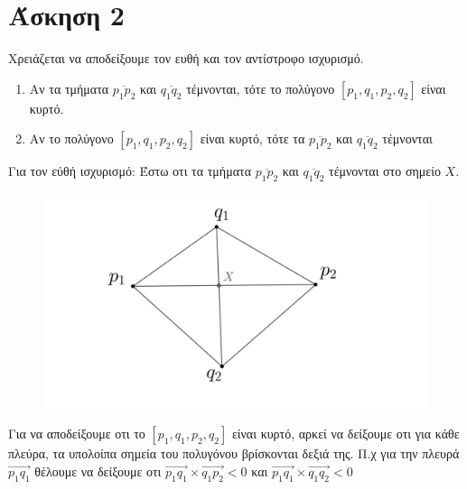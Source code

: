 \documentclass[12pt]{article}
\begin{document}
\section*{Άσκηση 2}
Χρειάζεται να αποδείξουμε τον ευθή και τον αντίστροφο ισχυρισμό.
\begin{enumerate}
\item Αν τα τμήματα $\overline{p_1p_2}$ και $\overline{q_1q_2}$ τέμνονται, τότε το πολύγονο $[p_1,q_1,p_2,q_2]$ είναι κυρτό.
\item Αν το πολύγονο $[p_1,q_1,p_2,q_2]$ είναι κυρτό, τότε τα $\overline{p_1p_2}$ και $\overline{q_1q_2}$ τέμνονται 
\end{enumerate}
Για τον εύθή ισχυρισμό:
Έστω οτι τα τμήματα $\overline{p_1p_2}$ και $\overline{q_1q_2}$ τέμνονται στο σημείο $X$.
\begin{figure}[H]

    \centering
    \includegraphics[scale = 1]{geogebra-export.png}\\ 
\end{figure}
Για να αποδείξουμε οτι το $[p_1,q_1,p_2,q_2]$ είναι κυρτό, αρκεί να δείξουμε οτι για κάθε πλεύρα, τα υπολοίπα σημεία του πολυγόνου βρίσκονται δεξιά της.
Π.χ για την πλευρά $\overrightarrow{p_1q_1}$ θέλουμε να δείξουμε οτι $\overrightarrow{p_1q_1}\times \overrightarrow{q_1p_2}<0$ και $\overrightarrow{p_1q_1}\times \overrightarrow{q_1q_2}<0$\\
\end{document}
